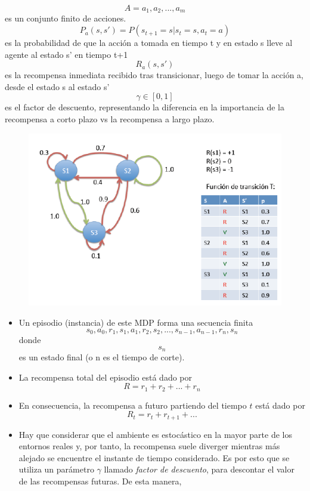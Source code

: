 \documentclass[11pt]{article}
\makeatletter
\def\maxwidth{\ifdim\Gin@nat@width>\linewidth\linewidth
    \else\Gin@nat@width\fi}
\let\Oldincludegraphics\includegraphics
\renewcommand{\includegraphics}[1]{\Oldincludegraphics[width=.8\maxwidth]{#1}}
\makeatother
\begin{document}
\[ A = {a_{1}, a_{2}, ..., a_{m}} \] es un conjunto finito de acciones.
\[ P_{a}(s,s') = P(s_{t+1} = s | s_{t} = s, a_{t} = a) \] es la
probabilidad de que la acción a tomada en tiempo t y en estado s lleve
al agente al estado s' en tiempo t+1 \[ R_{a}(s,s') \] es la recompensa
inmediata recibido tras transicionar, luego de tomar la acción a, desde
el estado s al estado s' \[\gamma \in  [0,1]\] es el factor de
descuento, representando la diferencia en la importancia de la
recompensa a corto plazo vs la recompensa a largo plazo.

    \begin{figure}
\centering
\includegraphics{images/mdp_example.png}
\caption{}
\end{figure}

    \begin{itemize}
\item
  Un episodio (instancia) de este MDP forma una secuencia finita
  \[s_{0}, a_{0}, r_{1}, s_{1}, a_{1}, r_{2}, s_{2}, ... , s_{n-1}, a_{n-1}, r_{n}, s_{n} \]
  donde \[s_{n}\] es un estado final (o n es el tiempo de corte).
\item
  La recompensa total del episodio está dado por
  \[ R = r_{1} + r_{2} + ... + r_{n} \]
\item
  En consecuencia, la recompensa a futuro partiendo del tiempo \(t\)
  está dado por \[R_{t} = r_{t} + r_{t+1} + ... \]
\item
  Hay que considerar que el ambiente es estocástico en la mayor parte de
  los entornos reales y, por tanto, la recompensa suele diverger
  mientras más alejado se encuentre el instante de tiempo considerado.
  Es por esto que se utiliza un parámetro \(γ\) llamado \emph{factor de
  descuento}, para descontar el valor de las recompensas futuras. De
  esta manera,
\end{itemize}
\end{document}
